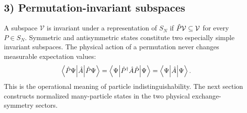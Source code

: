 \subsection*{3) Permutation-invariant subspaces}

A subspace $\mathcal V$ is invariant under a representation of $S_N$ if $\hat{P}\mathcal V\subseteq\mathcal V$ for every $P\in S_N$. Symmetric and antisymmetric states constitute two especially simple invariant subspaces. The physical action of a permutation never changes measurable expectation values:
\begin{equation}
\left\langle\hat{P}\Psi\middle|\hat{A}\middle|\hat{P}\Psi\right\rangle
 =\left\langle\Psi\middle|\hat{P}^\dagger\hat{A}\hat{P}\middle|\Psi\right\rangle
 =\left\langle\Psi\middle|\hat{A}\middle|\Psi\right\rangle.
\end{equation}
This is the operational meaning of particle indistinguishability. The next section constructs normalized many-particle states in the two physical exchange-symmetry sectors.

